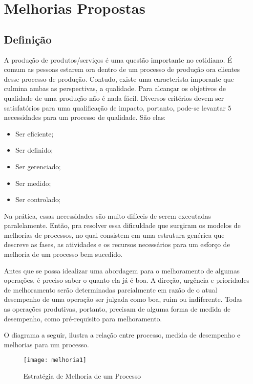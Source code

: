 \chapter[Melhorias Propostas]{Melhorias Propostas}
\label{chap:melhorias}

	\section[Definição]{Definição}
	\label{sec:melhorias_definicao}

		A produção de produtos/serviços é uma questão importante no cotidiano. É comum as pessoas estarem ora dentro de um processo de produção ora clientes desse processo de produção. Contudo, existe uma caracterista imporante que culmina ambas as perspectivas, a qualidade. Para alcançar os objetivos de qualidade de uma produção não é nada fácil. Diversos critérios devem ser satisfatórios para uma qualificação de impacto, portanto, pode-se levantar 5 necessidades para um processo de qualidade. São elas:

		\begin{itemize}
			\item{Ser eficiente;}
			\item{Ser definido;}
			\item{Ser gerenciado;}
			\item{Ser medido;}
			\item{Ser controlado;}
		\end{itemize}

		Na prática, essas necessidades são muito difíceis de serem executadas paralelamente. Então, pra resolver essa dificuldade que surgiram os modelos de melhorias de processos, no qual consistem em uma estrutura genérica que descreve as fases, as atividades e os recursos necessários para um esforço de melhoria de um processo bem sucedido.

		Antes que se possa idealizar uma abordagem para o melhoramento de algumas operações, é preciso saber o quanto ela já é boa. A direção, urgência e prioridades de melhoramento serão determinadas parcialmente em razão de o atual desempenho de uma operação ser julgada como boa, ruim ou indiferente. Todas as operações produtivas, portanto, precisam de alguma forma de medida de desempenho, como pré-requisito para melhoramento. \cite{slack}

		O diagrama a seguir, ilustra a relação entre processo, medida de desempenho e melhorias para um processo.

		\newpage
		\begin{figure}[h]
			\centering
			\texttt{[image: melhoria1]}
			\caption[Estratégia de Melhoria de um Processo]{Estratégia de Melhoria de um Processo}
			\label{fig:melhoria1}
		\end{figure}


